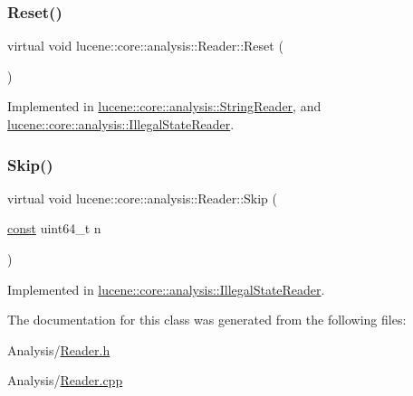 \mbox{\label{classlucene_1_1core_1_1analysis_1_1Reader_a5299f5469ce4ea9812ec79a59667945a}} 
\subsubsection{\texorpdfstring{Reset()}{Reset()}}
{\footnotesize\ttfamily virtual void lucene\+::core\+::analysis\+::\+Reader\+::\+Reset (\begin{DoxyParamCaption}{ }\end{DoxyParamCaption})\hspace{0.3cm}{\ttfamily [pure virtual]}}



Implemented in \mbox{\hyperlink{classlucene_1_1core_1_1analysis_1_1StringReader_ab68ad2d8d2e375cd063c374c570fcffa}{lucene\+::core\+::analysis\+::\+String\+Reader}}, and \mbox{\hyperlink{classlucene_1_1core_1_1analysis_1_1IllegalStateReader_a7c457898d46f0dcf7de18a1730330c02}{lucene\+::core\+::analysis\+::\+Illegal\+State\+Reader}}.

\mbox{\label{classlucene_1_1core_1_1analysis_1_1Reader_a3bd8e9f3e1d07d698bccabde41970219}} 
\subsubsection{\texorpdfstring{Skip()}{Skip()}}
{\footnotesize\ttfamily virtual void lucene\+::core\+::analysis\+::\+Reader\+::\+Skip (\begin{DoxyParamCaption}\item[{\mbox{\hyperlink{ZlibCrc32_8h_a2c212835823e3c54a8ab6d95c652660e}{const}} uint64\+\_\+t}]{n }\end{DoxyParamCaption})\hspace{0.3cm}{\ttfamily [pure virtual]}}



Implemented in \mbox{\hyperlink{classlucene_1_1core_1_1analysis_1_1IllegalStateReader_aa2a34d98ca51e81297960b13aa0fa18e}{lucene\+::core\+::analysis\+::\+Illegal\+State\+Reader}}.



The documentation for this class was generated from the following files\+:\begin{DoxyCompactItemize}
\item 
Analysis/\mbox{\hyperlink{Reader_8h}{Reader.\+h}}\item 
Analysis/\mbox{\hyperlink{Reader_8cpp}{Reader.\+cpp}}\end{DoxyCompactItemize}

